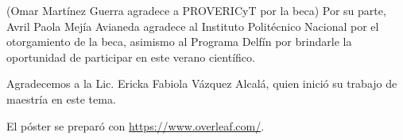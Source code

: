 \documentclass[a4]{sciposter}
\begin{document}
\begin{multicols}{2}
{    (Omar Martínez Guerra agradece a PROVERICyT por la beca)
    Por su parte, Avril Paola Mejía Avianeda agradece al Instituto Politécnico Nacional por el otorgamiento de la beca, asimismo al Programa Delfín por brindarle la oportunidad de participar en este verano científico.

    Agradecemos a la Lic. Ericka Fabiola Vázquez Alcalá, quien inició su trabajo de maestría en este tema.
    
    El póster se preparó con \url{https://www.overleaf.com/}.}

\end{multicols}



\end{document}
